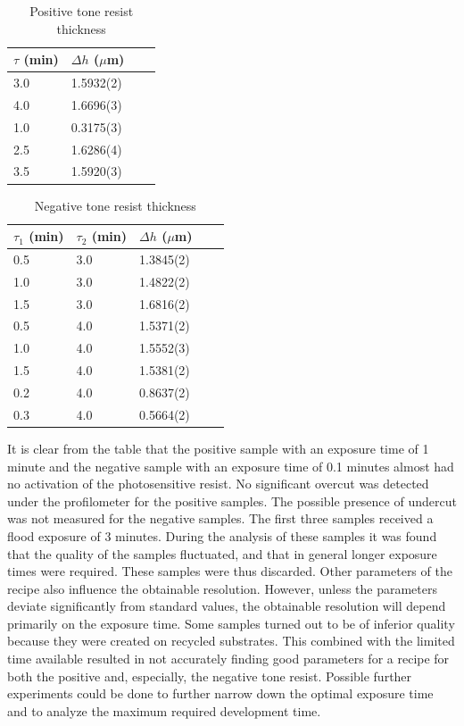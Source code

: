 \begin{table}[H]
    \centering
    \caption{Positive tone resist thickness}
    \begin{tabular}{X l l l}
        $\tau$ (min)& $\Delta h$ ($\mu$m) \\ 
        \hline\hline
        3.0 & 1.5932(2) \\
        4.0 & 1.6696(3) \\
        1.0 & 0.3175(3) \\
        2.5 & 1.6286(4) \\
        3.5 & 1.5920(3) \\
        \hline
    \end{tabular}
    \label{tab:pos_profile}
\end{table}

\begin{table}[H]
    \centering
    \caption{Negative tone resist thickness}
    \begin{tabular}{X l l l l}
	$\tau_1$ (min) & $\tau_2$ (min) & $\Delta h$ ($\mu$m) \\ 
        \hline\hline
        0.5 & 3.0 & 1.3845(2) \\
        1.0 & 3.0 & 1.4822(2) \\
        1.5 & 3.0 & 1.6816(2)  \\
        0.5 & 4.0 & 1.5371(2)  \\
        1.0 & 4.0 & 1.5552(3)  \\
        1.5 & 4.0 & 1.5381(2)  \\
        0.2 & 4.0 & 0.8637(2)  \\
        0.3 & 4.0 & 0.5664(2)  \\
        \hline
    \end{tabular}
    \label{tab:neg_profile}
\end{table}

It is clear from the table that the positive sample with an exposure time of  1 minute and the negative sample with an exposure time of 0.1 minutes almost had no activation of the photosensitive resist. No significant overcut was detected under the profilometer for the positive samples. The possible presence of undercut was not measured for the negative samples.
The first three samples received a flood exposure of 3 minutes. During the analysis of these samples it was found that the quality of the samples fluctuated, and that in general longer exposure times were required. These samples were thus discarded.
Other parameters of the recipe also influence the obtainable resolution. However, unless the parameters deviate significantly from standard values, the obtainable resolution will depend primarily on the exposure time. Some samples turned out to be of inferior quality because they were created on recycled substrates. This combined with the limited time available resulted in not accurately finding good parameters for a recipe for both the positive and, especially, the negative tone resist. Possible further experiments could be done to further narrow down the optimal exposure time and to analyze the maximum required development time.
